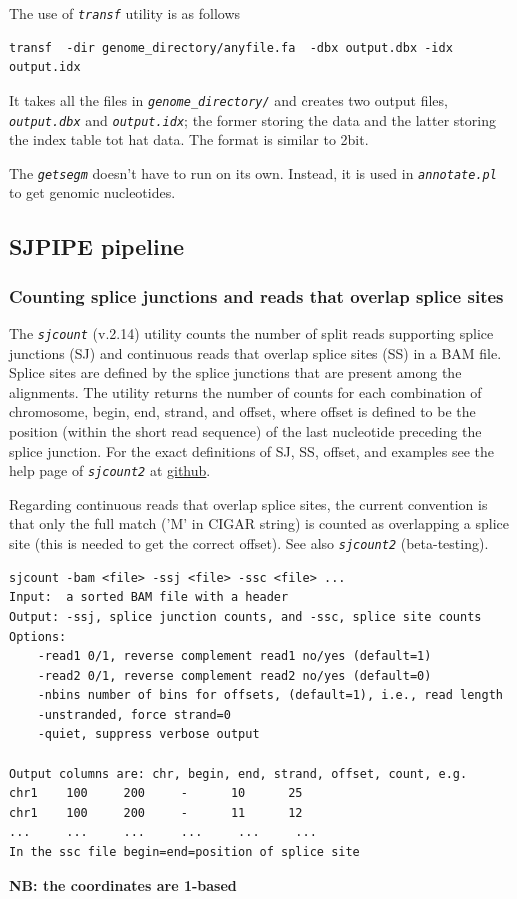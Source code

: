 \documentclass{article}
\newcommand{\prog}[1]{{\tt\em #1}}
\begin{document}
The use of \prog{transf} utility is as follows
\begin{verbatim} 
transf  -dir genome_directory/anyfile.fa  -dbx output.dbx -idx output.idx
\end{verbatim}

It takes all the files in \prog{genome\_directory/} and creates two output files, \prog{output.dbx} and \prog{output.idx}; the former storing the data and the latter 
storing the index table tot hat data. The format is similar to 2bit. 

The \prog{getsegm} doesn't have to run on its own. Instead, it is used in \prog{annotate.pl} to get genomic nucleotides.



\subsection{SJPIPE pipeline}

\subsubsection{Counting splice junctions and reads that overlap splice sites}
The \prog{sjcount} (v.2.14) utility counts the number of split reads supporting splice junctions (SJ) and continuous reads that overlap splice sites (SS) in a BAM file.
Splice sites are defined by the splice junctions that are present among the alignments. The utility returns the number of counts for each combination of chromosome, begin, 
end, strand, and offset, where offset is defined to be the position (within the short read sequence) of the last nucleotide preceding the splice junction. 
For the exact definitions of SJ, SS, offset, and examples see the help page of \prog{sjcount2} at \href{https://github.com/pervouchine/sjcount}{github}. 

Regarding continuous reads that overlap splice sites, the current convention is that only the full match ('M' in CIGAR string) is counted as overlapping a splice site 
(this is needed to get the correct offset). See also \prog{sjcount2} (beta-testing).
\begin{verbatim}
sjcount -bam <file> -ssj <file> -ssc <file> ...
Input:  a sorted BAM file with a header
Output: -ssj, splice junction counts, and -ssc, splice site counts 
Options:
	-read1 0/1, reverse complement read1 no/yes (default=1)
	-read2 0/1, reverse complement read2 no/yes (default=0)
	-nbins number of bins for offsets, (default=1), i.e., read length
	-unstranded, force strand=0
	-quiet, suppress verbose output

Output columns are: chr, begin, end, strand, offset, count, e.g.
chr1    100     200     -      10      25
chr1    100     200     -      11      12
...     ...     ...     ...     ...     ...
In the ssc file begin=end=position of splice site
\end{verbatim}
{\bf NB: the coordinates are 1-based}
\end{document}
